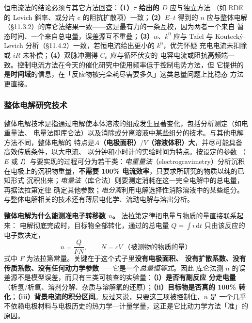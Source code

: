 \begin{crosscheck}
恒电流法的结论必须与其它方法回查：\textbf{（1）$\tau$ 给出的 $D$} 应与独立方法
（如 RDE 的 Levich 斜率、或分片 c 的阻抗扩散项）一致；\textbf{（2）}$E$–$t$ 得到的 $n$
应与整体电解（\S 11.3.2）的库仑法结果一致——这是最有力的一条互校，因为两者一个来自
暂态时间、一个来自总电量，误差源互不重叠；\textbf{（3）}$\alpha$、$k^{0}$ 应与
Tafel 与 Koutecký--Levich 分析（\S 11.4.2）一致，若恒电流给出更小的 $k^{0}$，优先怀疑
充电电流未扣除或 $iR$ 未补偿；\textbf{（4）}双脉冲测得 $C_{\mathrm{d}}$ 应与循环伏安的
电容电流或阻抗高频端一致。控制电流方法在今天的催化研究中使用频率低于控制电势方法，但
它提供的是\textbf{时间域}的信息，在「反应物被完全耗尽需要多久」这类总量问题上比稳态
方法更直接。
\end{crosscheck}

\subsubsection{整体电解研究技术}

整体电解技术是指通过电解使本体溶液的组成发生显著变化，包括分析测定（如电重量法、
电量法即库仑法）以及消除或分离溶液中某些组分的技术。与其他电解方法不同，整体电解的
特点是\textbf{$A$（电极面积）$/V$（溶液体积）大}，并尽可能具备高效传质条件，以大电流、
以分钟和小时计的实验时间为特点。按设定的参数
（$E$ 或 $I$）与要实现的过程可分为若干类：\emph{电重量法}（electrogravimetry）分析沉积
在电极上的沉积物重量，\textbf{不需要 100\% 电流效率}，只要求所研究的物质以纯的已知形式
沉积出来；\emph{电量法}（库仑法）则要测定消耗在这一完全电解中的总电量，再据法拉第定律
确定其他参数；\emph{电分离}利用电解选择性消除溶液中的某些组分。与整体电解相关的技术还有薄层电化学、流动电解与溶出分析。

\begin{principle}
\textbf{整体电解为什么能测准电子转移数 $n$。} 法拉第定律把电量与物质的量直接联系起来：
电解彻底完成时，目标物全部转化，通过的总电量
$Q=\int i\,\mathrm{d}t$ 只由该反应的电子数决定，
\begin{equation}
n=\frac{Q}{FN},\qquad N=cV\ \text{（被测物的物质的量）}
\label{eq:bulk-n}
\end{equation}
式中 $F$ 为法拉第常量。关键在于这个式子里\textbf{没有电极面积、
没有扩散系数、没有传质系数、没有任何动力学参数}——它是一个\emph{总量恒等式}。因此
库仑法测 $n$ 的误差源不是模型误差，而只有三类可核查的实验量：\textbf{（i）是否有副反应
分走电量}（析氢/析氧、溶剂分解、杂质与溶解氧的还原）；\textbf{（ii）目标物是否真的
100\% 转化}；\textbf{（iii）背景电流的积分区间}。反过来说，只要这三项被控制住，$n$ 是
一个几乎不依赖电极材料与电极历史的热力学—计量学量，这正是它比动力学方法「准」的原因。
\end{principle}


